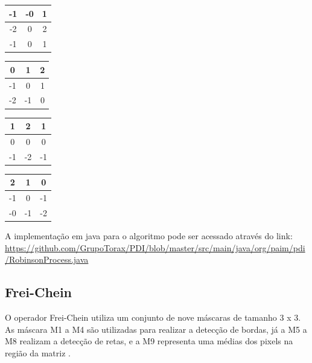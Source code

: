 \documentclass[
	12pt,				%
	oneside,			%
	a4paper,			%
	english,			%
	french,				%
	spanish,			%
	brazil,				%
	]{abntex2}
\begin{document}
\begin{tabular}{|c|c|c|}
    \hline
    -1 & -0 &  1   \\ \hline
	-2 &  0 &  2   \\ \hline   
	-1 &  0 &  1   \\ \hline   
\end{tabular}
\begin{tabular}{|c|c|c|}
    \hline
     0 &  1 &  2   \\ \hline
	-1 &  0 &  1   \\ \hline   
	-2 & -1 &  0   \\ \hline   
\end{tabular}
\begin{tabular}{|c|c|c|}
    \hline
     1 &  2 &  1   \\ \hline
	 0 &  0 &  0   \\ \hline   
	-1 & -2 & -1   \\ \hline   
\end{tabular}
\begin{tabular}{|c|c|c|}
    \hline
     2 &  1 &  0   \\ \hline
	-1 &  0 & -1   \\ \hline   
	-0 & -1 & -2   \\ \hline   
\end{tabular}


A implementação em java para o algoritmo pode ser acessado através do link:
\url{https://github.com/GrupoTorax/PDI/blob/master/src/main/java/org/paim/pdi/RobinsonProcess.java}

\subsection{Frei-Chein}
O operador Frei-Chein utiliza um conjunto de nove máscaras de tamanho 3 x 3. As máscara M1 a M4 são utilizadas para realizar a detecção de bordas, já a M5 a M8 realizam a detecção de retas, e a M9 representa uma médias dos pixels na região da matriz \cite{pedriniSchwartz:2008}. 
\end{document}

